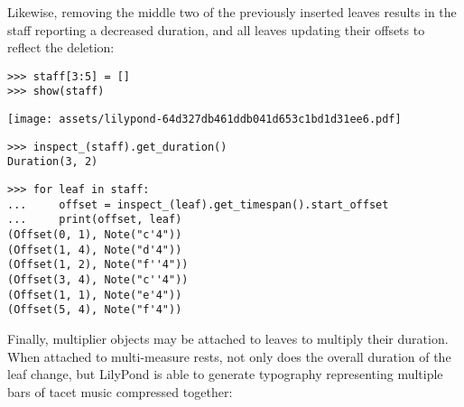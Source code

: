 \noindent Likewise, removing the middle two of the previously inserted leaves
results in the staff reporting a decreased duration, and all leaves updating
their offsets to reflect the deletion:

\begin{comment}
<abjad>
staff[3:5] = []
show(staff)
inspect_(staff).get_duration()
for leaf in staff:
    offset = inspect_(leaf).get_timespan().start_offset
    print(offset, leaf)
</abjad>
\end{comment}

\begin{abjadbookoutput}
\begin{singlespacing}
\vspace{-0.5\baselineskip}
\begin{verbatim}
>>> staff[3:5] = []
>>> show(staff)
\end{verbatim}
\noindent\texttt{[image: assets/lilypond-64d327db461ddb041d653c1bd1d31ee6.pdf]}
\begin{verbatim}
>>> inspect_(staff).get_duration()
Duration(3, 2)
\end{verbatim}
\begin{verbatim}
>>> for leaf in staff:
...     offset = inspect_(leaf).get_timespan().start_offset
...     print(offset, leaf)
(Offset(0, 1), Note("c'4"))
(Offset(1, 4), Note("d'4"))
(Offset(1, 2), Note("f''4"))
(Offset(3, 4), Note("c''4"))
(Offset(1, 1), Note("e'4"))
(Offset(5, 4), Note("f'4"))
\end{verbatim}
\end{singlespacing}
\end{abjadbookoutput}

\noindent Finally, multiplier objects may be attached to leaves to multiply
their duration. When attached to multi-measure rests, not only does the overall
duration of the leaf change, but LilyPond is able to generate typography
representing multiple bars of tacet music compressed together:

\begin{comment}
<abjad>
multimeasure_rest = scoretools.MultimeasureRest(1)
inspect_(multimeasure_rest).get_duration()
show(multimeasure_rest)
attach(Multiplier(4), multimeasure_rest)
inspect_(multimeasure_rest).get_duration()
show(multimeasure_rest)
</abjad>
\end{comment}

